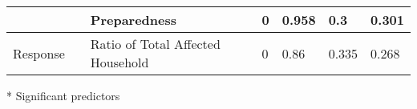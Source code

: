 \begin{table*}[!ht]
{\begin{threeparttable}
\begin{tabular}{|l|l|l|l|l|l|l|}
                            &                                           & Preparedness\tnote{*}                                    & 0                & 0.958            & 0.3           & 0.301                       \\ \hline
Response                    &                                           & Ratio of Total Affected Household               & 0                & 0.86             & 0.335         & 0.268                       \\ \hline

\end{tabular}%
\begin{tablenotes}
            \item[*] Significant predictors
\end{tablenotes}
\end{threeparttable}
}

\end{table*}